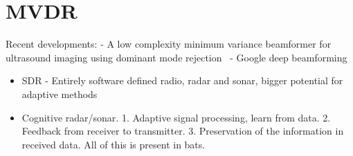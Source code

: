 %      
%      


\section{MVDR}

Recent developments:
- A low complexity minimum variance beamformer for ultrasound imaging using dominant mode rejection~\cite{Jiang2016}
- Google deep beamforming

\begin{itemize}
\item SDR - Entirely software defined radio, radar and sonar, bigger potential for adaptive methods
\item Cognitive radar/sonar. 1. Adaptive signal processing, learn from data. 2. Feedback from receiver to transmitter. 3. Preservation of the information in received data. All of this is present in bats.
\end{itemize}

